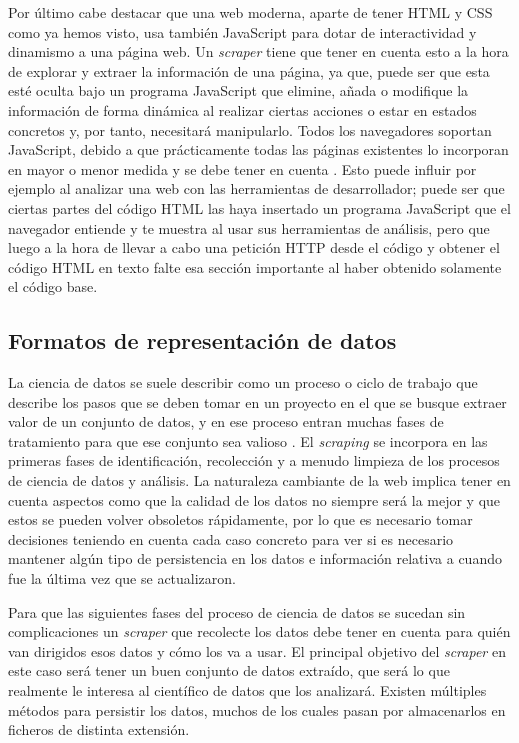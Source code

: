 Por último cabe destacar que una web moderna, aparte de tener HTML y CSS como ya
hemos visto, usa también JavaScript para dotar de interactividad y dinamismo a
una página web. Un \textit{scraper} tiene que tener en cuenta esto a la hora de
explorar y extraer la información de una página, ya que, puede ser que esta esté
oculta bajo un programa JavaScript que elimine, añada o modifique la información
de forma dinámica al realizar ciertas acciones o estar en estados concretos y,
por tanto, necesitará manipularlo. Todos los navegadores soportan JavaScript,
debido a que prácticamente todas las páginas existentes lo incorporan en mayor o
menor medida y se debe tener en cuenta \cite{apress2018scraping}. Esto puede
influir por ejemplo al analizar una web con las herramientas de desarrollador;
puede ser que ciertas partes del código HTML las haya insertado un programa
JavaScript que el navegador entiende y te muestra al usar sus herramientas de
análisis, pero que luego a la hora de llevar a cabo una petición HTTP desde el
código y obtener el código HTML en texto falte esa sección importante al haber
obtenido solamente el código base.

\subsection{Formatos de representación de datos}
La ciencia de datos se suele describir como un proceso o ciclo de trabajo que
describe los pasos que se deben tomar en un proyecto en el que se busque extraer
valor de un conjunto de datos, y en ese proceso entran muchas fases de
tratamiento para que ese conjunto sea valioso \cite{apress2018scraping}. El
\textit{scraping} se incorpora en las primeras fases de identificación,
recolección y a menudo limpieza de los procesos de ciencia de datos y análisis.
La naturaleza cambiante de la web implica tener en cuenta aspectos como que la
calidad de los datos no siempre será la mejor y que estos se pueden volver
obsoletos rápidamente, por lo que es necesario tomar decisiones teniendo en
cuenta cada caso concreto para ver si es necesario mantener algún tipo de
persistencia en los datos e información relativa a cuando fue la última vez que
se actualizaron.

Para que las siguientes fases del proceso de ciencia de datos se sucedan sin
complicaciones un \textit{scraper} que recolecte los datos debe tener en cuenta
para quién van dirigidos esos datos y cómo los va a usar. El principal objetivo
del \textit{scraper} en este caso será tener un buen conjunto de datos extraído,
que será lo que realmente le interesa al científico de datos que los analizará.
Existen múltiples métodos para persistir los datos, muchos de los cuales pasan
por almacenarlos en ficheros de distinta extensión.

